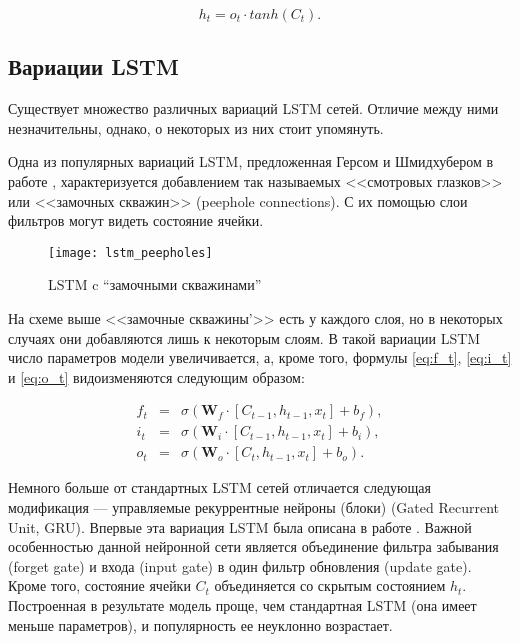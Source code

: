 \documentclass[specialist,
               substylefile = spbu.rtx,
               subf, 
               colorlinks=true, 12pt]{disser}
\begin{document}
\begin{equation*}
h_t = o_t \cdot tanh(C_t).
\end{equation*}


\subsection{Вариации LSTM}

Существует множество различных вариаций LSTM сетей. Отличие между ними незначительны, однако, о некоторых из них стоит упомянуть. 


Одна из популярных вариаций LSTM, предложенная Герсом и Шмидхубером в работе \cite{peephole}, характеризуется добавлением так называемых <<смотровых глазков>> или <<замочных скважин>> (peephole connections). С их помощью слои фильтров могут видеть состояние ячейки.

\begin{figure}[!h]
\begin{center}
\texttt{[image: lstm\_peepholes]}
\end{center}
\caption{LSTM c ``замочными скважинами''}
\end{figure}


На схеме выше <<замочные скважины'>> есть у каждого слоя, но в некоторых случаях они добавляются лишь к некоторым слоям. В такой вариации LSTM число параметров модели увеличивается, а, кроме того, формулы \eqref{eq:f_t}, \eqref{eq:i_t} и \eqref{eq:o_t} видоизменяются следующим образом:

\begin{eqnarray*}
f_t &=& \sigma(\mathbf{W}_f \cdot [C_{t-1},h_{t-1},x_t] + b_f), \\
i_t &=& \sigma(\mathbf{W}_i \cdot [C_{t-1},h_{t-1},x_t] + b_i), \\
o_t &=& \sigma(\mathbf{W}_o \cdot[C_t,h_{t-1},x_t] + b_o).
\end{eqnarray*}


Немного больше от стандартных LSTM сетей отличается следующая модификация --- управляемые рекуррентные нейроны (блоки) (Gated Recurrent Unit, GRU). Впервые эта вариация LSTM была описана в работе \cite{cho}. Важной особенностью данной нейронной сети является объединение фильтра забывания (forget gate)  и входа (input gate) в один фильтр обновления (update gate). Кроме того, состояние ячейки $C_t$ объединяется со скрытым состоянием $h_t$. Построенная в результате модель проще, чем стандартная LSTM (она имеет меньше параметров), и популярность ее неуклонно возрастает.
\end{document}
